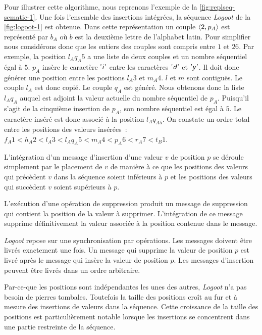 Pour illustrer cette algorithme, nous reprenons l'exemple de la \autoref{fig:replseq-sematic-1}.
Une fois l'ensemble des insertions intégrées, la séquence \emph{Logoot} de la \autoref{fig:logoot-1} est obtenue.
Dans cette représentation un couple $\tuple*{2, p_A}$ est représenté par $b_A$ où $b$ est la deuxième lettre de l'alphabet latin.
Pour simplifier nous considérons donc que les entiers des couples sont compris entre $1$ et $26$.
Par exemple, la position $l_A q_A5$ a une liste de deux couples et un nombre séquentiel égal à $5$.
$p_A$ insère le caractère $\textsf{'\textit{i}'}$ entre les caractères $\textsf{'\textit{d}'}$ et $\textsf{'\textit{y}'}$.
Il doit donc générer une position entre les positions $l_A3$ et $m_A4$.
$l$ et $m$ sont contiguës.
Le couple $l_A$ est donc copié.
Le couple $q_A$ est généré.
Nous obtenons donc la liste $l_A q_A$ auquel est adjoint la valeur actuelle du nombre séquentiel de $p_A$.
Puisqu'il s'agit de la cinquième insertion de $p_A$, son nombre séquentiel est égal à $5$.
Le caractère inséré est donc associé à la position $l_A q_{A5}$.
On constate un ordre total entre les positions des valeurs insérées~: $f_A1 < h_A2 < l_A3 < l_A q_A5 < m_A4 < p_A6 < r_A7 < t_B1$.

L'intégration d'un message d'insertion d'une valeur $v$ de position $p$ se déroule simplement par le placement de $v$ de manière à ce que les positions des valeurs qui précèdent $v$ dans la séquence soient inférieurs à $p$ et les positions des valeurs qui succèdent $v$ soient supérieurs à $p$.

L'exécution d'une opération de suppression produit un message de suppression qui contient la position de la valeur à supprimer.
L'intégration de ce message supprime définitivement la valeur associée à la position contenue dans le message.

\emph{Logoot} repose sur une synchronisation par opérations.
Les messages doivent être livrés exactement une fois.
Un message qui supprime la valeur de position $p$ est livré après le message qui insère la valeur de position $p$.
Les messages d'insertion peuvent être livrés dans un ordre arbitraire.

Par-ce-que les positions sont indépendantes les unes des autres, \emph{Logoot} n'a pas  besoin de pierres tombales.
Toutefois la taille des positions croît au fur et à mesure des insertions de valeurs dans la séquence.
Cette croissance de la taille des positions est particulièrement notable lorsque les insertions se concentrent dans une partie restreinte de la séquence.

